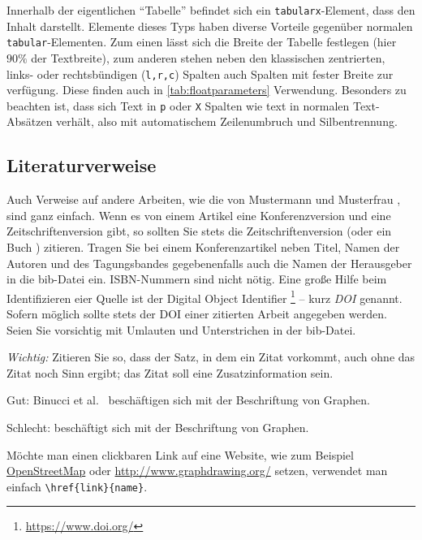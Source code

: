\documentclass[bachelor,german]{algothesis}
\begin{document}
Innerhalb der eigentlichen ``Tabelle'' befindet sich ein \verb+tabularx+-Element, dass den Inhalt darstellt.
Elemente dieses Typs haben diverse Vorteile gegenüber normalen \verb+tabular+-Elementen.
Zum einen lässt sich die Breite der Tabelle festlegen (hier $90\%$ der Textbreite), zum anderen stehen neben den klassischen zentrierten, links- oder rechtsbündigen (\verb+l,r,c+) Spalten auch Spalten mit fester Breite zur verfügung.
Diese finden auch in \cref{tab:floatparameters} Verwendung. 
Besonders zu beachten ist, dass sich Text in \verb+p+ oder \verb+X+ Spalten wie text in normalen Text-Absätzen verhält, also mit automatischem Zeilenumbruch und Silbentrennung.

\subsection{Literaturverweise}

Auch Verweise auf andere Arbeiten, wie die von Mustermann und Musterfrau \cite{mustermann+etal-11}, sind ganz einfach.  
Wenn es von einem Artikel eine Konferenzversion \cite{bdln-lhod-02} und eine Zeitschriftenversion \cite{bdln-odgvel-05} gibt, so sollten Sie stets die Zeitschriftenversion (oder ein Buch \cite{gj-cigtn-79}) zitieren.
Tragen Sie bei einem Konferenzartikel neben Titel, Namen der Autoren und des Tagungsbandes gegebenenfalls auch die Namen der Herausgeber in die bib-Datei ein. 
ISBN-Nummern sind nicht nötig.  
Eine große Hilfe beim Identifizieren eier Quelle ist der Digital Object Identifier%
\footnote{\href{https://www.doi.org/}{https://www.doi.org/}}
-- kurz \emph{DOI} genannt.
Sofern möglich sollte stets der DOI einer zitierten Arbeit angegeben werden.
Seien Sie vorsichtig mit Umlauten \cite{bkns-blol-10} und Unterstrichen in der bib-Datei.

\emph{Wichtig:} Zitieren Sie so, dass der Satz, in dem ein Zitat vorkommt, auch ohne das Zitat noch Sinn ergibt; 
das Zitat soll eine Zusatzinformation sein. 
\begin{description}
\item{Gut:} Binucci et al.\ \cite{bdln-odgvel-05} beschäftigen sich mit der Beschriftung von Graphen.  
\item{Schlecht:} \cite{bdln-odgvel-05} beschäftigt sich mit der Beschriftung von Graphen.
\end{description}

Möchte man einen clickbaren Link auf eine Website, wie zum Beispiel \href{https://www.openstreetmap.de/}{OpenStreetMap} oder \href{http://www.graphdrawing.org/}{http://www.graphdrawing.org/} setzen, verwendet man einfach \verb+\href{link}{name}+.
\end{document}
